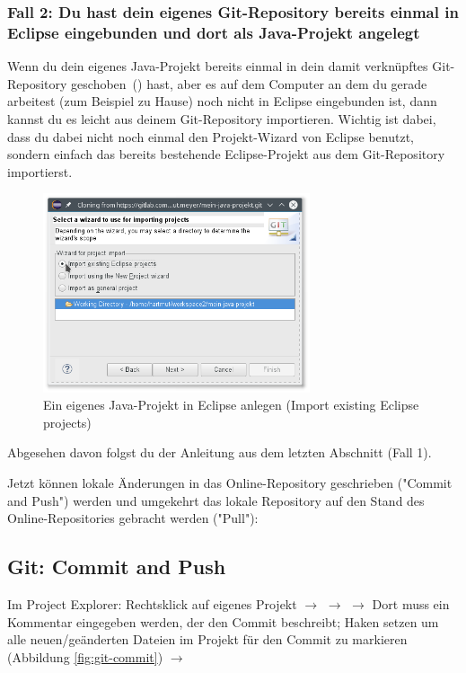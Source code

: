 \subsubsection{Fall 2: Du hast dein eigenes Git-Repository bereits einmal in
Eclipse eingebunden und dort als Java-Projekt angelegt}

Wenn du dein eigenes Java-Projekt bereits einmal in dein damit
verknüpftes Git-Repository \glqq geschoben\grqq\ () hast,
aber es auf dem Computer an dem du gerade arbeitest (zum Beispiel zu Hause) noch
nicht in Eclipse eingebunden ist, dann kannst du es leicht aus deinem
Git-Repository importieren. Wichtig ist dabei, dass du dabei nicht noch einmal
den Projekt-Wizard von Eclipse benutzt, sondern einfach das bereits bestehende
Eclipse-Projekt aus dem Git-Repository importierst. 

\begin{figure}[h]
  \centering
   \includegraphics[width=0.70\textwidth]{./inf/SEKII/01_Vorbereitung/Import_Project_from_Git_Import_Existing_Eclipse_Project.png}
   \caption{Ein eigenes Java-Projekt in Eclipse anlegen (Import existing Eclipse projects)}
   \label{fig:import-project-from-git-import-existing-project}
\end{figure}

Abgesehen davon folgst du der Anleitung aus dem letzten Abschnitt (Fall 1).

Jetzt können lokale Änderungen in das Online-Repository geschrieben ("Commit
and Push") werden und umgekehrt das lokale Repository auf den Stand des
Online-Repositories gebracht werden ("Pull"):

\subsection{Git: Commit and Push}

Im Project Explorer: Rechtsklick auf eigenes Projekt $\rightarrow$ 
$\rightarrow$  $\rightarrow$ Dort muss ein Kommentar
eingegeben werden, der den Commit beschreibt; Haken setzen um alle
neuen/geänderten Dateien im Projekt für den Commit zu markieren (Abbildung
\ref{fig:git-commit}) $\rightarrow$ 

